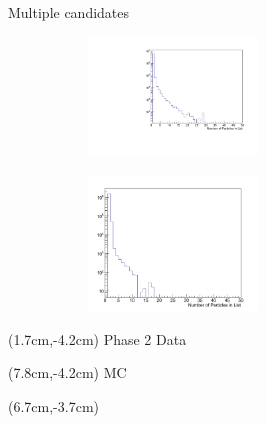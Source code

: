 \documentclass[10pt]{beamer}
\begin{document}
{\begin{frame}{Multiple candidates}
	
	
		\begin{figure}
		\begin{subfigure}{.5\textwidth}
			\centering
			\includegraphics[width=4.5cm]{Plots/NumVpho}
			
			\label{fig:sub1}
		\end{subfigure}%
		\begin{subfigure}{.5\textwidth}
			\centering
			\includegraphics[width=4.5cm]{Plots/NumVphoMC}
			
			\label{fig:sub2}
		\end{subfigure}
		
		\label{fig:test}
	\end{figure}


\begin{textblock*}{\textwidth}(1.7cm,-4.2cm)
	Phase 2 Data
\end{textblock*}	


\begin{textblock*}{\textwidth}(7.8cm,-4.2cm)
	MC
\end{textblock*}

\begin{textblock*}{\textwidth}(6.7cm,-3.7cm)
\end{textblock*}
	
\end{frame}



}
\end{document}
